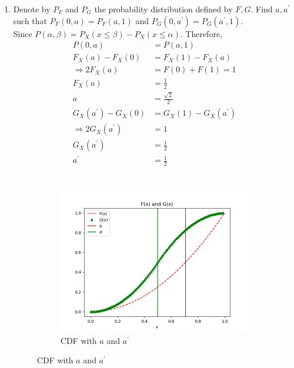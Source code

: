 \documentclass[preprint,12pt]{elsarticle}
\begin{document}
\begin{enumerate}
    \item Denote by $P_F$ and $P_G$ the probability distribution defined
    by $F,G$. Find $a,a^{'}$ such that $P_F(0,a)=P_F(a,1)$ and 
    $P_G(0,a^{'})=P_G(a^{'},1)$.\\

    Since $P(\alpha,\beta) = P_X(x\leq \beta) - P_X(x\leq \alpha)$. Therefore,
    \begin{align*}
        P(0, a)     &= P(a, 1) \\
        F_X(a) - F_X(0)     &= F_X(1) - F_X(a) \\
        \Rightarrow 2F_X(a) &= F(0) + F(1) = 1 \\
                    F_X(a)  &= \frac{1}{2} \\
                        a   &= \frac{\sqrt{2}}{2} \\
        G_X(a^{'}) - G_X(0)     &= G_X(1) - G_X(a^{'}) \\
        \Rightarrow 2G_X(a^{'}) &= 1 \\
                    G_X(a^{'})  &= \frac{1}{2}\\
                    a^{'}       &= \frac{1}{2} \\
    \end{align*}
    \\
    \begin{figure}[htbp!]
        \center
        \begin{subfigure}{0.8\textwidth}
            \includegraphics[width = \textwidth]{3.png}
            \caption{CDF with $a$ and $a^{'}$}
            \label{fig:3-1}
        \end{subfigure}

\end{figure}
\end{enumerate}
\end{document}
